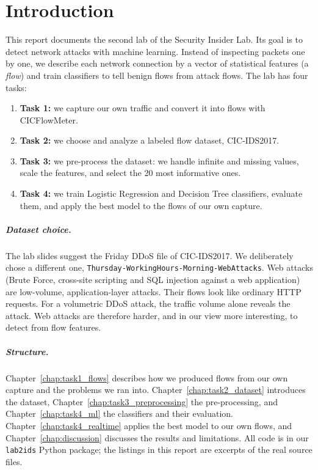 \chapter{Introduction}\label{chap:introduction}

This report documents the second lab of the Security Insider Lab. Its goal is to detect network attacks with machine learning. Instead of inspecting packets one by one, we describe each network connection by a vector of statistical features (a \emph{flow}) and train classifiers to tell benign flows from attack flows. The lab has four tasks:

\begin{enumerate}\setlength\itemsep{0pt}
	\item \textbf{Task 1:} we capture our own traffic and convert it into flows with CICFlowMeter.
	\item \textbf{Task 2:} we choose and analyze a labeled flow dataset, CIC-IDS2017.
	\item \textbf{Task 3:} we pre-process the dataset: we handle infinite and missing values, scale the features, and select the 20 most informative ones.
	\item \textbf{Task 4:} we train Logistic Regression and Decision Tree classifiers, evaluate them, and apply the best model to the flows of our own capture.
\end{enumerate}

\paragraph{Dataset choice.} The lab slides suggest the Friday DDoS file of CIC-IDS2017. We deliberately chose a different one, \texttt{Thursday-WorkingHours-Morning-WebAttacks}. Web attacks (Brute Force, cross-site scripting and SQL injection against a web application) are low-volume, application-layer attacks. Their flows look like ordinary HTTP requests. For a volumetric DDoS attack, the traffic volume alone reveals the attack. Web attacks are therefore harder, and in our view more interesting, to detect from flow features.

\paragraph{Structure.} Chapter~\ref{chap:task1_flows} describes how we produced flows from our own capture and the problems we ran into. Chapter~\ref{chap:task2_dataset} introduces the dataset, Chapter~\ref{chap:task3_preprocessing} the pre-processing, and Chapter~\ref{chap:task4_ml} the classifiers and their evaluation. Chapter~\ref{chap:task4_realtime} applies the best model to our own flows, and Chapter~\ref{chap:discussion} discusses the results and limitations. All code is in our \texttt{lab2ids} Python package; the listings in this report are excerpts of the real source files.
